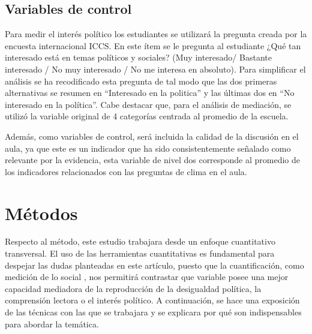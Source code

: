 \documentclass[12pt,twoside]{templates/facsothesis}
\begin{document}
\hypertarget{variables-de-control}{%
\subsection{Variables de control}\label{variables-de-control}}

Para medir el interés político los estudiantes se utilizará la pregunta creada por la encuesta internacional ICCS. En este ítem se le pregunta al estudiante ¿Qué tan interesado está en temas políticos y sociales? (Muy interesado/ Bastante interesado / No muy interesado / No me interesa en absoluto). Para simplificar el análisis se ha recodificado esta pregunta de tal modo que las dos primeras alternativas se resumen en ``Interesado en la politica'' y las últimas dos en ``No interesado en la política''. Cabe destacar que, para el análisis de mediación, se utilizó la variable original de 4 categorías centrada al promedio de la escuela.

Además, como variables de control, será incluida la calidad de la discusión en el aula, ya que este es un indicador que ha sido consistentemente señalado como relevante por la evidencia, esta variable de nivel dos corresponde al promedio de los indicadores relacionados con las preguntas de clima en el aula.

\hypertarget{muxe9todos}{%
\section{Métodos}\label{muxe9todos}}

Respecto al método, este estudio trabajara desde un enfoque cuantitativo transversal. El uso de las herramientas cuantitativas es fundamental para despejar las dudas planteadas en este artículo, puesto que la cuantificación, como medición de lo social \citep{canales_METODOLOGIAS_2006}, nos permitirá contrastar que variable posee una mejor capacidad mediadora de la reproducción de la desigualdad política, la comprensión lectora o el interés político. A continuación, se hace una exposición de las técnicas con las que se trabajara y se explicara por qué son indispensables para abordar la temática.
\end{document}
